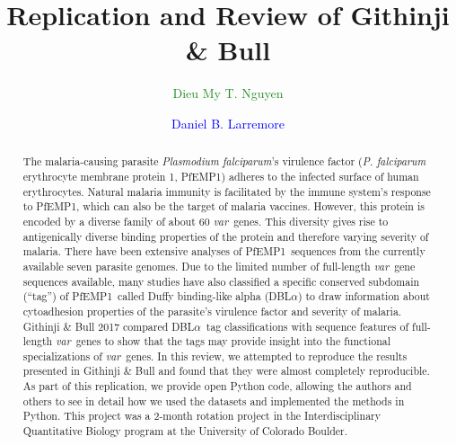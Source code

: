 \documentclass[10pt,twocolumn,superscriptaddress]{revtex4-1}
\newcommand{\dieumy}[1]{\textcolor{ForestGreen}{#1}}
\newcommand{\dan}[1]{\textcolor{blue}{#1}}
\newcommand{\var}{{\it var}\xspace}
\newcommand{\pf}{{\it P. falciparum}\xspace}
\newcommand{\pfem}{{PfEMP1}\xspace}
\newcommand{\dbla}{{DBL$\alpha$}\xspace}
\newcommand{\paper}{{Githinji \& Bull}\xspace}
\begin{document}
\author{\dieumy{Dieu My T. Nguyen}}
\author{\dan{Daniel B. Larremore}}
	

\title{Replication and Review of \paper}
\begin{abstract}
The malaria-causing parasite \textit{Plasmodium falciparum}'s virulence factor (\pf erythrocyte membrane protein 1, \pfem) adheres to the infected surface of human erythrocytes. Natural malaria immunity is facilitated by the immune system's response to \pfem, which can also be the target of malaria vaccines. However, this protein is encoded by a diverse family of about 60 \var\ genes. This diversity gives rise to antigenically diverse binding properties of the protein and therefore varying severity of malaria. There have been extensive analyses of \pfem\ sequences from the currently available seven parasite genomes. Due to the limited number of full-length \var\ gene sequences available, many studies have also classified a specific conserved subdomain (``tag'') of \pfem\ called Duffy binding-like alpha (\dbla) to draw information about cytoadhesion properties of the parasite's virulence factor and severity of malaria. \paper 2017 compared \dbla\ tag classifications with sequence features of full-length \var\ genes to show that the tags may provide insight into the functional specializations of \var\ genes. In this review, we attempted to reproduce the results presented in \paper and found that they were almost completely reproducible. As part of this replication, we provide open Python code, allowing the authors and others to see in detail how we used the datasets and implemented the methods in Python. This project was a 2-month rotation project in the Interdisciplinary Quantitative Biology program at the University of Colorado Boulder.  
\end{abstract}
\maketitle

\end{document}
